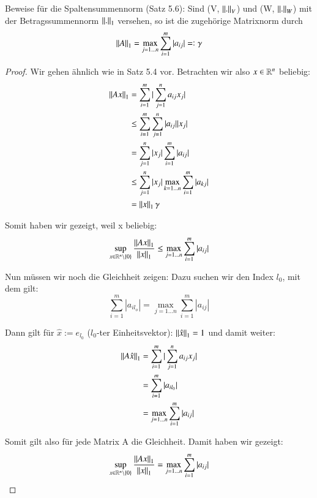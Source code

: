 \begin{exercise}
Beweise für die Spaltensummennorm (Satz 5.6): Sind (V, $\left\lVert.\right\rVert_V$) und (W, $\left\lVert.\right\rVert_W$) mit der Betragssummennorm $\left\lVert.\right\rVert_1$ versehen, so ist die zugehörige Matrixnorm  durch
\begin{equation*}
\left\lVert A\right\rVert_1 = \max_{j=1...n} \sum_{i=1}^{m} | a_{ij} | =: \gamma
\end{equation*}
\end{exercise}

\begin{proof}
Wir gehen ähnlich wie in Satz 5.4 vor. Betrachten wir also $x \in \mathbb{R}^n$ beliebig:
\begin{equation*}
\begin{split}
\left\lVert Ax\right\rVert_1 & = \sum_{i=1}^{m} | \sum_{j=1}^{n} a_{ij} x_j | \\
& \le \sum_{i=1}^{m} \sum_{j=1}^{n} | a_{ij} | | x_j | \\
& = \sum_{j=1}^{n} | x_j | \sum_{i=1}^{m} | a_{ij} | \\
& \le \sum_{j=1}^{n} | x_j | \max_{k=1...n} \sum_{i=1}^{m} | a_{kj} | \\
& = \left\lVert x\right\rVert_1 \gamma
\end{split}
\end{equation*}

Somit haben wir gezeigt, weil x beliebig:
\begin{equation*}
\sup_{x \in \mathbb{R}^n \backslash \{0\}} \frac{\left\lVert Ax\right\rVert_1}{\left\lVert x\right\rVert_1} \le \max_{j=1...n} \sum_{i=1}^{m} | a_{ij} |
\end{equation*}


Nun müssen wir noch die Gleichheit zeigen:
Dazu suchen wir den Index $l_0$, mit dem gilt:
\begin{equation*}
\sum_{i=1}^{m} | a_{il_o} | = \max_{j=1...n} \sum_{i=1}^{m} | a_{ij} |
\end{equation*}

Dann gilt für $\hat{x} := e_{l_0}$ ($l_0$-ter Einheitsvektor): $\left\lVert\hat{x}\right\rVert_1 = 1$ und damit weiter:
\begin{equation*}
\begin{split}
\left\lVert A\hat{x}\right\rVert_1 & = \sum_{i=1}^{m} | \sum_{j=1}^{n} a_{ij} x_j | \\
& = \sum_{i=1}^{m} | a_{il_0} | \\
& = \max_{j=1...n} \sum_{i=1}^{m} | a_{ij} | \\
\end{split}
\end{equation*}

Somit gilt also für jede Matrix A die Gleichheit. Damit haben wir gezeigt:
\begin{equation*}
\sup_{x \in \mathbb{R}^n \backslash \{0\}} \frac{\left\lVert Ax\right\rVert_1}{\left\lVert x\right\rVert_1} = \max_{j=1...n} \sum_{i=1}^{m} | a_{ij} |
\end{equation*}

\end{proof}
